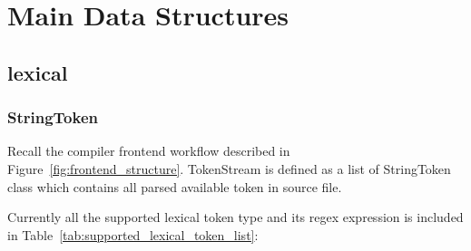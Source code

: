 \documentclass{report}
\newcommand{\+}{}
\begin{document}
    \section{Main Data Structures}\label{sec:main-data-structures}

    \subsection{lexical}\label{subsec:lexical2}

    \subsubsection{StringToken }
    Recall the compiler frontend workflow described in Figure~\ref{fig:frontend_structure}. TokenStream is defined as
    a list of StringToken class which contains all parsed available token in source file.\par
    Currently all the supported lexical token type and its regex expression is included in Table~\ref{tab:supported_lexical_token_list}: \par
\end{document}
